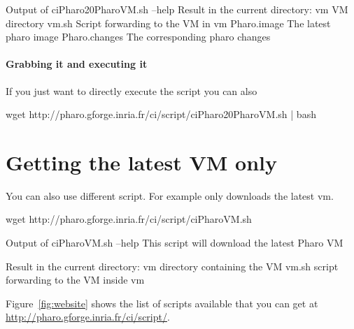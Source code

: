 \documentclass[a4paper,10pt,twoside]{book}
\begin{document}
\begin{code}{Output of ciPharo20PharoVM.sh --help }
Result in the current directory:
    vm               VM directory
    vm.sh            Script forwarding to the VM in vm
    Pharo.image      The latest pharo image
    Pharo.changes    The corresponding pharo changes
\end{code}


\paragraph{Grabbing it and executing it}
If you just want to directly execute the script you can also 


\begin{code}{}
wget http://pharo.gforge.inria.fr/ci/script/ciPharo20PharoVM.sh | bash
\end{code}


\section{Getting the latest VM only}
You can also use different script. For example  only downloads the latest vm.

\begin{code}{}
wget http://pharo.gforge.inria.fr/ci/script/ciPharoVM.sh
\end{code}

\begin{code}{Output of ciPharoVM.sh --help}
This script will download the latest Pharo VM

Result in the current directory:
    vm               directory containing the VM
    vm.sh            script forwarding to the VM inside vm
\end{code}


Figure~\ref{fig:website} shows the list of scripts available that you can get at \url{http://pharo.gforge.inria.fr/ci/script/}.
\end{document}
